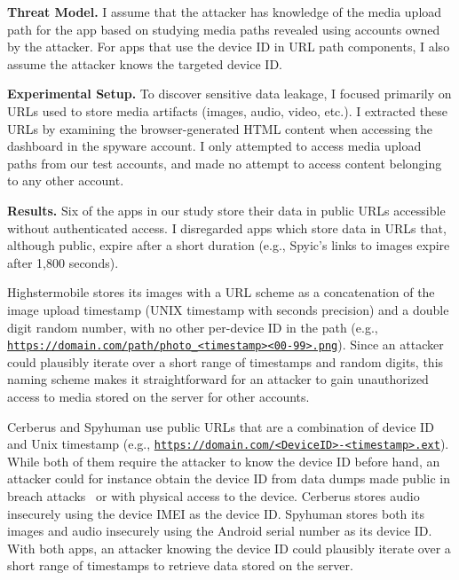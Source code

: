 \textbf{Threat Model.} I assume that the attacker has knowledge of
the media upload path for the app based on studying media paths
revealed using accounts owned by the attacker.  For apps that use the
device ID in URL path components, I also assume the attacker knows
the targeted device ID.

\textbf{Experimental Setup.} To discover sensitive data leakage, I
focused primarily on URLs used to store media artifacts (images,
audio, video, etc.).  I extracted these URLs by examining the
browser-generated HTML content when accessing the dashboard in the
spyware account.  I only attempted to access media upload paths from
our test accounts, and made no attempt to access content belonging to
any other account.


\textbf{Results.}  Six of the apps in our study store their data in
public URLs accessible without authenticated access.  I disregarded
apps which store data in URLs that, although public, expire after a
short duration (e.g., Spyic's links to images expire after 1,800
seconds).


Highstermobile stores its images with a URL scheme as a concatenation
of the image upload timestamp (UNIX timestamp with seconds precision)
and a double digit random number, with no other per-device ID in the
path (e.g.,
\texttt{\url{https://domain.com/path/photo_<timestamp><00-99>.png}}).
Since an attacker could plausibly iterate over a short range of
timestamps and random digits, this naming scheme makes it
straightforward for an attacker to gain unauthorized access to media
stored on the server for other accounts.

Cerberus and Spyhuman use public URLs that are a combination of device
ID and Unix timestamp
(e.g., \texttt{\url{https://domain.com/<DeviceID>-<timestamp>.ext}}).
While both of them require the attacker to know the device ID before
hand, an attacker could for instance obtain the device ID from data
dumps made public in breach attacks~\cite{mSpybrea38:online,
  Companyt8:online, HackerSt66:online, Cerberus12:online,
  Stalkerw59:online} or with physical access to the device.
Cerberus stores audio insecurely using the device IMEI as the device
ID.  Spyhuman stores both its images and audio insecurely using the
Android serial number as its device ID.  With both apps, an attacker
knowing the device ID could plausibly iterate over a short range of
timestamps to retrieve data stored on the server.

